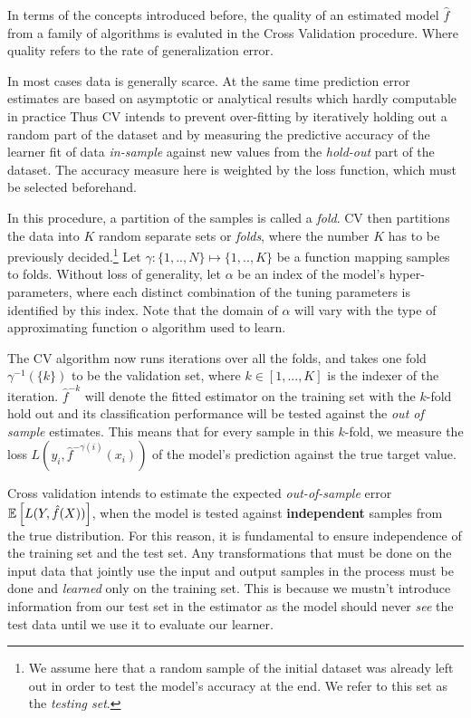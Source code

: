 In terms of the concepts introduced before, the quality of an estimated model $\hat{f}$ from a family of algorithms is evaluted in the Cross Validation procedure. Where quality refers to the rate of generalization error.

In most cases data is generally scarce. At the same time prediction error estimates are based on asymptotic or analytical results which hardly computable in practice Thus CV intends to prevent over-fitting by iteratively holding out a random part of the dataset and by measuring the predictive accuracy of the learner fit of data \textit{in-sample} against new values from the \textit{hold-out} part of the dataset. The accuracy measure here is weighted by the loss function, which must be selected beforehand.

In this procedure, a partition of the samples is called a \textit{fold}. CV then partitions the data into $K$ random separate sets or  \textit{folds}, where the number $K$ has to be previously decided.\footnote{ We assume here that a random sample of the initial dataset was already left out in order to test the model's accuracy at the end. We refer to this set as the \textit{testing set}.} Let $\gamma : \{1,..,N\} \mapsto \{1, .., K\}$ be a function mapping samples to folds. Without loss of generality, let $\alpha$ be an index of the model's hyper-parameters, where each distinct combination of the tuning parameters is identified by this index. Note that the domain of $\alpha$ will vary with the type of approximating function o algorithm used to learn.

 The CV algorithm now runs iterations over all the folds, and takes one fold $\gamma^{-1}(\{k\})$ to be the validation set, where $k \in [1,...,K]$ is the indexer of the iteration. $\hat{f}^{-k}$ will denote the fitted estimator on the training set with the $k$-fold hold out and its classification performance will be tested against the \textit{out of sample} estimates. This means that for every sample in this $k$-fold, we measure the loss $L(y_i, \hat{f}^{-\gamma(i)}(x_i))$ of the model's prediction against the true target value.

Cross validation intends to estimate the expected \textit{out-of-sample} error $\operatorname{\mathbb{E}} \left[ L(Y, \hat{f}(X)) \right]$, when the model is tested against \textbf{independent} samples from the true distribution. For this reason, it is fundamental to ensure independence of the training set and the test set. Any transformations that must be done on the input data that jointly use the input and output samples in the process must be done and \textit{learned} only on the training set. This is because we mustn't introduce information from our test set in the estimator as the model should never \textit{see} the test data until we use it to evaluate our learner.


